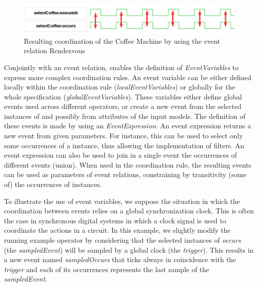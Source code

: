 	\begin{figure}[h]
		\center
		\includegraphics[width=.8\textwidth]{bcool/figs/runningrdv}
		\caption{Resulting coordination of the Coffee Machine by using the event relation Rendezvous}
		\label{fig:runningrdv}
	\end{figure}


Conjointly with an event relation, \bcool enables the definition of \emph{EventVariables} to express more complex coordination rules. An event variable can be either defined locally within the coordination rule (\emph{localEventVariables}) or globally for the whole specification (\emph{globalEventVariables}). These variables either define global events used across different operators, or create a new event from the selected instances of \dse and possibly from attributes of the input models. The definition of these events is made by using an \emph{EventExpression}. An event expression returns a new event from given parameters. For instance, this can be used to select only some occurrences of a \dse instance, thus allowing the implementation of filters. An event expression can also be used to join in a single event the occurrences of different events (union). When used in the coordination rule, the resulting events can be used as parameters of event relations, constraining by transitivity (some of) the occurrences of \dse instances.

To illustrate the use of event variables, we suppose the situation in which the coordination between events relies on a global synchronization clock. This is often the case in synchronous digital systems in which a clock signal is used to coordinate the actions in a circuit. In this example, we slightly modify the running example operator by considering that the selected instances of \dse \emph{occurs} (the \emph{sampledEvent}) will be sampled by a global clock (the \emph{trigger}). This results in a new event named \emph{sampledOccurs} that ticks always in coincidence with the \emph{trigger} and each of its occurrences represents the last sample of the \emph{sampledEvent}. 
	
